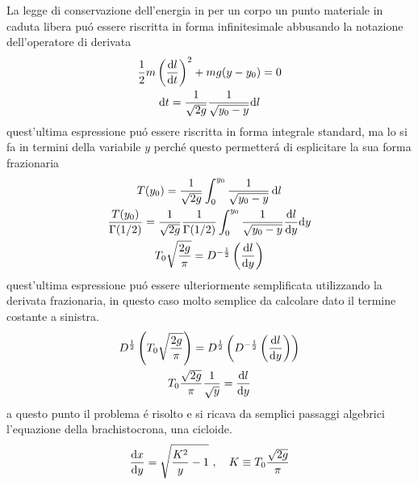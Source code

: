\begin{multicols*}{3}
  La legge di conservazione dell'energia in per un corpo un punto materiale in caduta libera pu\'o essere
  riscritta in forma infinitesimale abbusando la notazione dell'operatore di derivata
  \begin{equation}
    \begin{gathered}
      \frac{1}{2}m\left(\dv{l}{t}\right)^2 + mg(y-y_0) = 0 \\
      \text{d}t = \frac{1}{\sqrt{2g}}\frac{1}{\sqrt{y_0 - y}}\text{d}l
    \end{gathered}
  \end{equation}
  quest'ultima espressione pu\'o essere riscritta in forma integrale standard, ma lo si fa in termini della
  variabile $y$ perch\'e questo permetter\'a di esplicitare la sua forma frazionaria
  \begin{equation}
    \begin{gathered}
      T(y_0) = \frac{1}{\sqrt{2g}} \int_{0}^{y_0} \frac{1}{\sqrt{y_0 - y}}\dd{l} \\
      \frac{T(y_0)}{\Gamma(1/2)} = \frac{1}{\sqrt{2g}}\frac{1}{\Gamma(1/2)}\int_{0}^{y_0} \frac{1}{\sqrt{y_0 - y}} \dv{l}{y}\text{d}y \\
      T_0\sqrt{\frac{2g}{\pi}} = D^{-\frac{1}{2}}\left(\dv{l}{y}\right)
    \end{gathered}
  \end{equation}
  quest'ultima espressione pu\'o essere ulteriormente semplificata utilizzando la derivata frazionaria,
  in questo caso molto semplice da calcolare dato il termine costante a sinistra.
  \begin{equation}
    \begin{gathered}
      D^{\frac{1}{2}}\left(T_0\sqrt{\frac{2g}{\pi}}\right) = D^{\frac{1}{2}}\left(D^{-\frac{1}{2}}\left(\dv{l}{y}\right)\right) \\
      T_0\frac{\sqrt{2g}}{\pi}\frac{1}{\sqrt{y}} = \dv{l}{y} \\
    \end{gathered}
  \end{equation}
  a questo punto il problema \'e risolto e si ricava da semplici passaggi algebrici l'equazione della brachistocrona, una cicloide.
  \begin{equation}
    \dv{x}{y} = \sqrt{\frac{K^2}{y} - 1} ~, \quad K \equiv T_0\frac{\sqrt{2g}}{\pi}
  \end{equation}

\end{multicols*}


